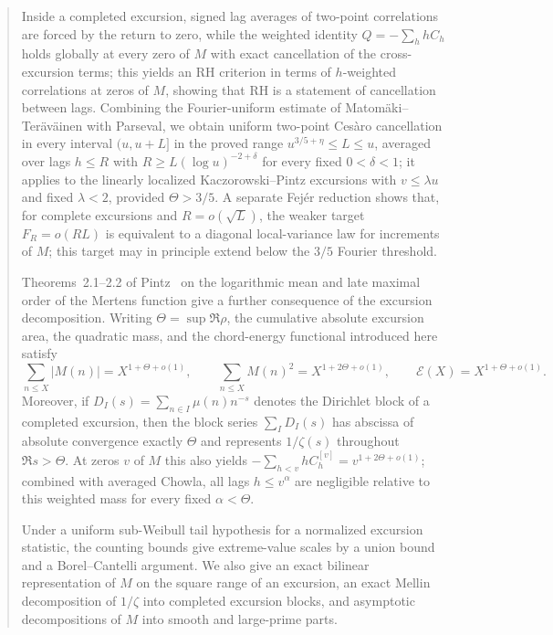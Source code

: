 \documentclass[11pt]{amsart}
\numberwithin{equation}{section}
\theoremstyle{plain}
\theoremstyle{definition}
\theoremstyle{remark}
\newcommand{\En}{\mathcal{E}}
\begin{document}
\begin{abstract}
Inside a completed excursion, signed lag averages of two-point correlations
are forced by the return to zero, while the weighted identity
$Q=-\sum_hhC_h$ holds globally at every zero of $M$ with exact cancellation
of the cross-excursion terms; this yields an RH criterion in terms of
$h$-weighted correlations at zeros of $M$, showing that RH is a statement
of cancellation between lags. Combining the Fourier-uniform estimate of
Matom\"aki--Ter\"av\"ainen with Parseval, we obtain uniform two-point
Ces\`aro cancellation in every interval $(u,u+L]$ in the proved range
$u^{3/5+\eta}\le L\le u$, averaged over lags $h\le R$ with $R\ge L(\log u)^{-2+\delta}$ for every fixed $0<\delta<1$; it applies to the linearly localized Kaczorowski--Pintz excursions with
$v\le\lambda u$ and fixed $\lambda<2$, provided $\Theta>3/5$. A separate Fej\'er reduction shows that, for complete excursions and $R=o(\sqrt L)$, the weaker target $F_R=o(RL)$ is equivalent to a diagonal local-variance law for increments of $M$; this target may in principle extend below the $3/5$ Fourier threshold.

Theorems~2.1--2.2 of Pintz~\cite{Pintz2026} on the logarithmic mean and
late maximal order of the Mertens function give a further consequence of the excursion decomposition.  Writing
$\Theta=\sup\Re\rho$, the cumulative absolute excursion area, the quadratic
mass, and the chord-energy functional introduced here satisfy
\[
 \sum_{n\le X}|M(n)|=X^{1+\Theta+o(1)},\qquad
 \sum_{n\le X}M(n)^2=X^{1+2\Theta+o(1)},\qquad
 \En(X)=X^{1+\Theta+o(1)}.
\]
Moreover, if $D_I(s)=\sum_{n\in I}\mu(n)n^{-s}$ denotes the Dirichlet block
of a completed excursion, then the block series $\sum_I D_I(s)$ has abscissa
of absolute convergence exactly $\Theta$ and represents $1/\zeta(s)$
throughout $\Re s>\Theta$.  At zeros $v$ of $M$ this also yields
$-\sum_{h<v}hC_h^{[v]}=v^{1+2\Theta+o(1)}$; combined with averaged Chowla,
all lags $h\le v^\alpha$ are negligible relative to this weighted mass for
every fixed $\alpha<\Theta$.

Under a uniform sub-Weibull tail hypothesis for a normalized excursion
statistic, the counting bounds give extreme-value scales by a union bound
and a Borel--Cantelli argument. We also give an exact bilinear
representation of $M$ on the square range of an excursion, an exact Mellin
decomposition of $1/\zeta$ into completed excursion blocks, and asymptotic
decompositions of $M$ into smooth and large-prime parts.
\end{abstract}

\maketitle
\end{document}
